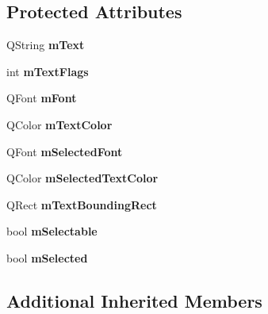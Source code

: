 \subsection*{Protected Attributes}
\begin{DoxyCompactItemize}
\item 
\mbox{\label{class_q_c_p_text_element_a2ef3d8f044b2a0520c90561b3b533028}} 
Q\+String {\bfseries m\+Text}
\item 
\mbox{\label{class_q_c_p_text_element_a221eb95ecda1056eb79d56f1230f45d5}} 
int {\bfseries m\+Text\+Flags}
\item 
\mbox{\label{class_q_c_p_text_element_a2fef52fa1ec006799102b2956133ba29}} 
Q\+Font {\bfseries m\+Font}
\item 
\mbox{\label{class_q_c_p_text_element_a3685263a99eacd98b180d29adc8e8830}} 
Q\+Color {\bfseries m\+Text\+Color}
\item 
\mbox{\label{class_q_c_p_text_element_a5d242628c9c4beb361b82676c4851c38}} 
Q\+Font {\bfseries m\+Selected\+Font}
\item 
\mbox{\label{class_q_c_p_text_element_ad523a852d47bc97b1af62a4d0dedf2ad}} 
Q\+Color {\bfseries m\+Selected\+Text\+Color}
\item 
\mbox{\label{class_q_c_p_text_element_a226bb09aae41b1d106f6b00d52def0cb}} 
Q\+Rect {\bfseries m\+Text\+Bounding\+Rect}
\item 
\mbox{\label{class_q_c_p_text_element_a112e8f9898991fe54f94fcb7effddc2f}} 
bool {\bfseries m\+Selectable}
\item 
\mbox{\label{class_q_c_p_text_element_a7a46eb67459a3c8c80d19aa28b8ae791}} 
bool {\bfseries m\+Selected}
\end{DoxyCompactItemize}
\subsection*{Additional Inherited Members}


